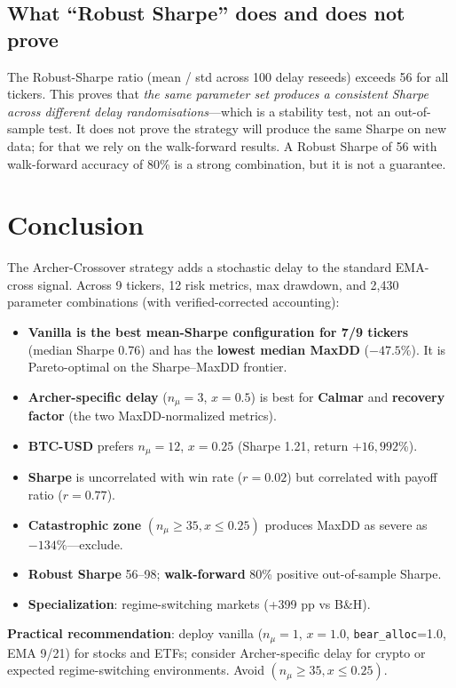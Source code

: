 \documentclass[11pt,a4paper]{article}
\begin{document}
\subsection{What ``Robust Sharpe'' does and does not prove}

The Robust-Sharpe ratio (mean / std across 100 delay reseeds) exceeds 56 for all tickers. This proves that \emph{the same parameter set produces a consistent Sharpe across different delay randomisations}---which is a stability test, not an out-of-sample test. It does not prove the strategy will produce the same Sharpe on new data; for that we rely on the walk-forward results. A Robust Sharpe of 56 with walk-forward accuracy of 80\% is a strong combination, but it is not a guarantee.

\section{Conclusion}

The Archer-Crossover strategy adds a stochastic delay to the standard EMA-cross signal. Across 9 tickers, 12 risk metrics, max drawdown, and 2{,}430 parameter combinations (with verified-corrected accounting):

\begin{itemize}
\item \textbf{Vanilla is the best mean-Sharpe configuration for 7/9 tickers} (median Sharpe 0.76) and has the \textbf{lowest median MaxDD} ($-47.5\%$). It is Pareto-optimal on the Sharpe--MaxDD frontier.
\item \textbf{Archer-specific delay} ($n_\mu=3$, $x=0.5$) is best for \textbf{Calmar} and \textbf{recovery factor} (the two MaxDD-normalized metrics).
\item \textbf{BTC-USD} prefers $n_\mu=12$, $x=0.25$ (Sharpe 1.21, return $+16{,}992$\%).
\item \textbf{Sharpe} is uncorrelated with win rate ($r=0.02$) but correlated with payoff ratio ($r=0.77$).
\item \textbf{Catastrophic zone} $(n_\mu \geq 35, x \leq 0.25)$ produces MaxDD as severe as $-134\%$---exclude.
\item \textbf{Robust Sharpe} 56--98; \textbf{walk-forward} 80\% positive out-of-sample Sharpe.
\item \textbf{Specialization}: regime-switching markets (+399 pp vs B\&H).
\end{itemize}

\textbf{Practical recommendation}: deploy vanilla ($n_\mu=1$, $x=1.0$, \texttt{bear\_alloc}=1.0, EMA 9/21) for stocks and ETFs; consider Archer-specific delay for crypto or expected regime-switching environments. Avoid $(n_\mu \geq 35, x \leq 0.25)$.
\end{document}
